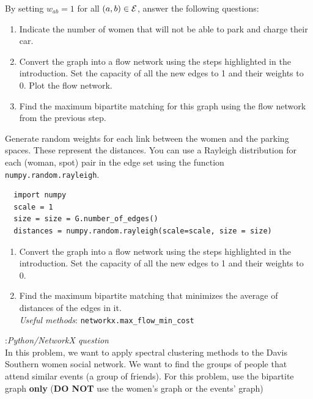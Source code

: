 \documentclass[11pt]{exam}
\begin{document}
\begin{questions}
\begin{parts}
By setting $w_{ab} = 1$ for all $(a,b) \in \cal E$, answer the following questions: 
\begin{enumerate}[label=(\roman*)]
\item Indicate the number of women that will not be able to park and charge their car. 
\item Convert the graph into a flow network using the steps highlighted in the introduction.
Set the capacity of all the new edges to 1 and their weights to 0. Plot the flow network. 
\item Find the maximum bipartite matching for this graph using the flow network from the previous step. 
\end{enumerate}
\item Generate random weights for each link between the women and the parking spaces. These represent the distances. You can use a Rayleigh distribution for each (woman, spot) pair in the edge set using the function \texttt{numpy.random.rayleigh}.
\begin{verbatim}
  import numpy
  scale = 1
  size = size = G.number_of_edges()
  distances = numpy.random.rayleigh(scale=scale, size = size)
\end{verbatim}
\begin{enumerate}[label=(\roman*)]
  \item Convert the graph into a flow network using the steps highlighted in the introduction.
  Set the capacity of all the new edges to 1 and their weights to 0.
  \item Find the maximum bipartite matching that minimizes the average of distances of the edges in it.\\
  \textit{Useful methods}: \texttt{networkx.max\_flow\_min\_cost}
\end{enumerate}

\end{parts}


:{\it Python/NetworkX question}\\
In this problem, we want to apply spectral clustering methods to the Davis Southern women social network. We want to find the groups of people that attend similar events (a group of friends). For this problem, use the bipartite graph {\bf only} ({\bf DO NOT} use the women's graph or the events' graph)
\end{questions}
\end{document}
